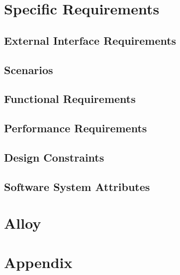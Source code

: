 \documentclass[a4paper,12pt]{report}
\begin{document}
	\chapter{Specific Requirements}
	\label{ch:Specific_Requirements}

	\section{External Interface Requirements}
	

	\section{Scenarios}
	

	\section{Functional Requirements} 
	

	\section{Performance Requirements} 
	

	\section{Design Constraints}
	
	
	\section{Software System Attributes} 
	


	\chapter{Alloy} 
	\label{ch: alloy}

	\appendix
	\chapter{Appendix}
\end{document}
